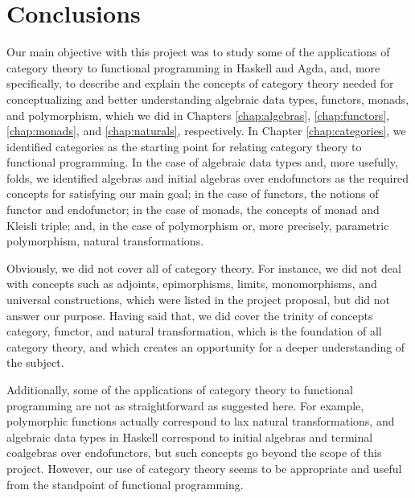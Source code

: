 \chapter{Conclusions}
\label{chap:conclusions}

\begin{epigraphs}
\end{epigraphs}

Our main objective with this project was to study some of the
applications of category theory to functional programming in Haskell
and Agda, and, more specifically, to describe and explain the concepts
of category theory needed for conceptualizing and better understanding
algebraic data types, functors, monads, and polymorphism, which we did
in Chapters \ref{chap:algebras}, \ref{chap:functors},
\ref{chap:monads}, and \ref{chap:naturals}, respectively. In Chapter
\ref{chap:categories}, we identified categories as the starting point
for relating category theory to functional programming. In the case of
algebraic data types and, more usefully, folds, we identified algebras
and initial algebras over endofunctors as the required concepts for
satisfying our main goal; in the case of functors, the notions of
functor and endofunctor; in the case of monads, the concepts of monad
and Kleisli triple; and, in the case of polymorphism or, more
precisely, parametric polymorphism, natural transformations.

Obviously, we did not cover all of category theory. For instance, we
did not deal with concepts such as adjoints, epimorphisms, limits,
monomorphisms, and universal constructions, which were listed in the
project proposal, but did not answer our purpose. Having said that, we
did cover the trinity of concepts category, functor, and natural
transformation, which is the foundation of all category theory, and
which creates an opportunity for a deeper understanding of the
subject.

Additionally, some of the applications of category theory to
functional programming are not as straightforward as suggested here.
For example, polymorphic functions actually correspond to lax natural
transformations, and algebraic data types in Haskell correspond to
initial algebras and terminal coalgebras over endofunctors, but such
concepts go beyond the scope of this project. However, our use of
category theory seems to be appropriate and useful from the standpoint
of functional programming.


